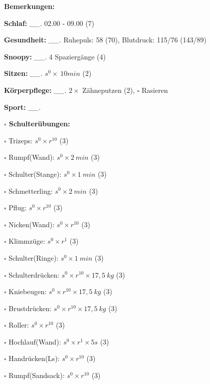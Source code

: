 \documentclass[10pt,a4paper]{article}
\newcommand\prop[1] {{\color {alizarin} {\bf #1}}}             %
\newcommand\mand[1] {{\color {burntorange} {\bf #1}}}          %
\newcommand\topspace{\vskip -15pt \hskip 20pt}
\newcommand\n[1] { {\sl #1.} \hskip 5pt }
\begin{document}
\begin{mdframed}[style=daystyle]
  \begin{labeling}{{\mand {Bemerkungen:}}}
    \setlength\itemsep{-3pt}
  \item[{\mand {Schlaf:}}]        \n{\_\_} 02.00 - 09.00 (7)
  \item[{\mand {Gesundheit:}}]    \n{\_\_} Ruhepuls: 58 (70), Blutdruck: 115/76 (143/89)
  \item[{\mand {Snoopy:}}]        \n{\_\_} 4 Spaziergänge (4) 
  \item[{\mand {Sitzen:}}]        \n{\_\_} $s^0 \times\ 10 min$ (2)
  \item[{\mand {Körperpflege:}}]  \n{\_\_} $2 \times$ Zähneputzen (2), $\square$ Rasieren
  \item[{\mand {Sport:}}]         \n{\_\_}
    \topspace
    \begin{minipage}{0.75\textwidth}  
      \begin{labeling}{\prop {$\square$ {Schulterübungen:}}} 
        \setlength\itemsep{-3pt}
      \item[$\square$ Trizeps:]          $s^0 \times r^{10}$ (3)
      \item[$\square$ Rumpf(Wand):]      $s^0 \times 2\ min$ (3)
      \item[$\square$ Schulter(Stange):] $s^0 \times 1\ min$ (3)
      \item[$\square$ Schmetterling:]    $s^0 \times 2\ min$ (3)
      \item[$\square$ Pflug:]            $s^0 \times r^{10}$ (3)
      \item[$\square$ Nicken(Wand):]     $s^0 \times r^{10}$ (3)
      \item[$\square$ Klimmzüge:]        $s^0 \times r^1$ (3)
      \item[$\square$ Schulter(Ringe):]  $s^0 \times 1\ min$ (3)
      \item[$\square$ Schulterdrücken:]  $s^0 \times r^{10} \times 17,5\ kg$ (3)
      \item[$\square$ Kniebeugen:]       $s^0 \times r^{10} \times 17,5\ kg$ (3)
      \item[$\square$ Brustdrücken:]     $s^0 \times r^{10} \times 17,5\ kg$ (3)
      \item[$\square$ Roller:]           $s^0 \times r^{10}$ (3)
      \item[$\square$ Hochlauf(Wand):]   $s^0 \times r^{1} \times 5s$ (3)
      \item[$\square$ Handrücken(Ls):]   $s^0 \times r^{10}$ (3)
      \item[$\square$ Rumpf(Sandsack):]  $s^0 \times r^{10}$ (3)

\end{labeling}
\end{minipage}
\end{labeling}
\end{mdframed}
\end{document}
